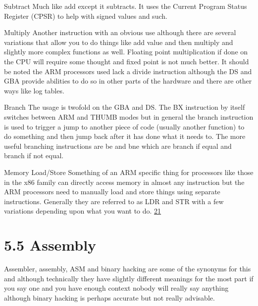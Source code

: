 \documentclass[
]{book}
\begin{document}
Subtract Much like add except it subtracts. It uses the Current Program Status Register (CPSR) to help with signed values and such.

Multiply Another instruction with an obvious use although there are several variations that allow you to do things like add value and then multiply and slightly more complex functions as well. Floating point multiplication if done on the CPU will require some thought and fixed point is not much better. It should be noted the ARM processors used lack a divide instruction although the DS and GBA provide abilities to do so in other parts of the hardware and there are other ways like log tables.

Branch The usage is twofold on the GBA and DS. The BX instruction by itself switches between ARM and THUMB modes but in general the branch instruction is used to trigger a jump to another piece of code (usually another function) to do something and then jump back after it has done what it needs to. The more useful branching instructions are be and bne which are branch if equal and branch if not equal.

Memory Load/Store Something of an ARM specific thing for processors like those in the x86 family can directly access memory in almost any instruction but the ARM processors need to manually load and store things using separate instructions. Generally they are referred to as LDR and STR with a few variations depending upon what you want to do. \href{romhacking202022.html\#fn21x0}{21}

\hypertarget{assembly}{%
\section{5.5 Assembly}\label{assembly}}

Assembler, assembly, ASM and binary hacking are some of the synonyms for this and although technically they have slightly different meanings for the most part if you say one and you have enough context nobody will really say anything although binary hacking is perhaps accurate but not really advisable.
\end{document}
